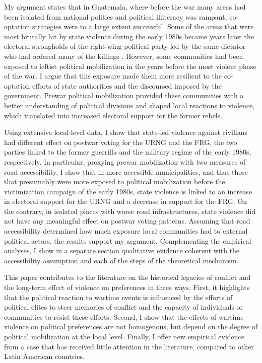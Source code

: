 \documentclass[12pt, notitlepage]{article}
\begin{document}
My argument states that in Guatemala, where before the war many areas had been isolated from national politics and political illiteracy was rampant, co-optation strategies were to a large extent successful.
Some of the areas that were most brutally hit by state violence during the early 1980s became years later the electoral strongholds of the right-wing political party led by the same dictator who had ordered many of the killings \citep{Ball:1999ab}.
However, some communities had been exposed to leftist political mobilization in the years before the most violent phase of the war.
I argue that this exposure made them more resilient to the co-optation efforts of state authorities and the discoursed imposed by the government.
Prewar political mobilization provided these communities with a better understanding of political divisions and shaped local reactions to violence, which translated into increased electoral support for the former rebels.

Using extensive local-level data, I show that state-led violence against civilians had different effect on postwar voting for the URNG and the FRG, the two parties linked to the former guerrilla and the military regime of the early 1980s, respectively.
In particular, proxying prewar mobilization with two measures of road accessibility, I show that in more accessible municipalities, and thus those that presumably were more exposed to political mobilization before the victimization campaign of the early 1980s, state violence is linked to an increase in electoral support for the URNG and a decrease in support for the FRG.
On the contrary, in isolated places with worse road infrastructures, state violence did not have any meaningful effect on postwar voting patterns.
Assuming that road accessibility determined how much exposure local communities had to external political actors, the results support my argument.
Complementing the empirical analyses, I show in a separate section qualitative evidence coherent with the accessibility assumption and each of the steps of the theoretical mechanism.

This paper contributes to the literature on the historical legacies of conflict \citep{Daly:2012aa, Weintraub:2015aa, Osorio:2018aa, Zhukov:2018aa, Osorio:2021aa} and the long-term effect of violence on preferences \citep{Balcells:2012aa, Lupu:2017aa, Fontana:2017aa, Rozenas:2017aa, Rozenas:2019aa} in three ways.
First, it highlights that the political reaction to wartime events is influenced by the efforts of political elites to steer memories of conflict and the capacity of individuals or communities to resist these efforts.
Second, I show that the effects of wartime violence on political preferences are not homogenous, but depend on the degree of political mobilization at the local level.
Finally, I offer new empirical evidence from a case that has received little attention in the literature, compared to other Latin American countries.
\end{document}
